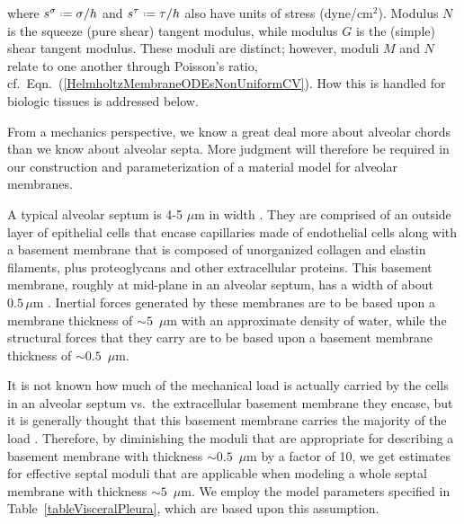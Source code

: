 where $s^{\sigma} \defeq \sigma / h$ and $s^{\tau} \defeq \tau / h$ also have units of stress (dyne/$\text{cm}^2$).  Modulus $N$ is the squeeze (pure shear) tangent modulus, while modulus $G$ is the (simple) shear tangent modulus.  These moduli are distinct; however, moduli $M$ and $N$ relate to one another through Poisson's ratio, cf.\ Eqn.~(\ref{HelmholtzMembraneODEsNonUniformCV}).  How this is handled for biologic tissues is addressed below.

From a mechanics perspective, we know a great deal more about alveolar chords than we know about alveolar septa.  More judgment will therefore be required in our construction and parameterization of a material model for alveolar membranes.  

A typical alveolar septum is 4-5 $\mu$m in width \cite{Sukietal11}.  They are comprised of an outside layer of epithelial cells that encase capillaries made of endothelial cells along with a basement membrane that is composed of unorganized collagen and elastin filaments, plus proteoglycans and other extracellular proteins.  This basement membrane, roughly at mid-plane in an alveolar septum, has a width of about $0.5 \, \mu$m \cite{RoanWaters11}.  Inertial forces generated by these membranes are to be based upon a membrane thickness of $\sim\!\!5$~$\mu$m with an approximate density of water, while the structural forces that they carry are to be based upon a basement membrane thickness of $\sim\!\! 0.5$~$\mu$m.  

It is not known how much of the mechanical load is actually carried by the cells in an alveolar septum vs.\ the extracellular basement membrane they encase, but it is generally thought that this basement membrane carries the majority of the load \cite{Sukietal11}.  Therefore, by diminishing the moduli that are appropriate for describing a basement membrane with thickness $\sim\!\! 0.5$~$\mu$m by a factor of 10, we get estimates for effective septal moduli that are applicable when modeling a whole septal membrane with thickness $\sim\!\! 5$~$\mu$m.  We employ the model parameters specified in Table~\ref{tableVisceralPleura}, which are based upon this assumption.


